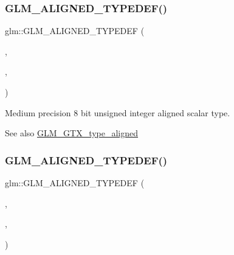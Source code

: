 \subsubsection{\texorpdfstring{G\+L\+M\+\_\+\+A\+L\+I\+G\+N\+E\+D\+\_\+\+T\+Y\+P\+E\+D\+E\+F()}{GLM\_ALIGNED\_TYPEDEF()}\hspace{0.1cm}{\footnotesize\ttfamily [85/209]}}
{\footnotesize\ttfamily glm\+::\+G\+L\+M\+\_\+\+A\+L\+I\+G\+N\+E\+D\+\_\+\+T\+Y\+P\+E\+D\+EF (\begin{DoxyParamCaption}\item[{\hyperlink{group__gtc__type__precision_gadfa38f3c245d371c4b2079f1fd68928b}{mediump\+\_\+uint8\+\_\+t}}]{,  }\item[{aligned\+\_\+mediump\+\_\+uint8\+\_\+t}]{,  }\item[{1}]{ }\end{DoxyParamCaption})}

Medium precision 8 bit unsigned integer aligned scalar type. \begin{DoxySeeAlso}{See also}
\hyperlink{group__gtx__type__aligned}{G\+L\+M\+\_\+\+G\+T\+X\+\_\+type\+\_\+aligned} 
\end{DoxySeeAlso}
\mbox{\label{group__gtx__type__aligned_ga1ca98c67f7d1e975f7c5202f1da1df1f}} 
\subsubsection{\texorpdfstring{G\+L\+M\+\_\+\+A\+L\+I\+G\+N\+E\+D\+\_\+\+T\+Y\+P\+E\+D\+E\+F()}{GLM\_ALIGNED\_TYPEDEF()}\hspace{0.1cm}{\footnotesize\ttfamily [86/209]}}
{\footnotesize\ttfamily glm\+::\+G\+L\+M\+\_\+\+A\+L\+I\+G\+N\+E\+D\+\_\+\+T\+Y\+P\+E\+D\+EF (\begin{DoxyParamCaption}\item[{\hyperlink{group__gtc__type__precision_ga0b385466deac5ac96061ef2cdd6db20f}{mediump\+\_\+uint16\+\_\+t}}]{,  }\item[{aligned\+\_\+mediump\+\_\+uint16\+\_\+t}]{,  }\item[{2}]{ }\end{DoxyParamCaption})}


